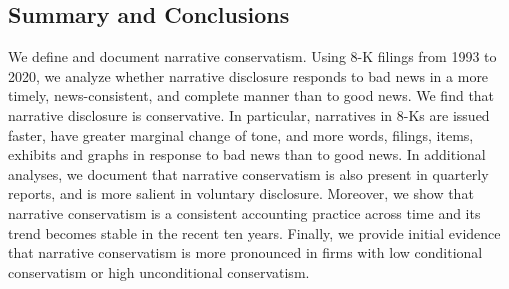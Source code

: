 \documentclass[letterpaper,12pt]{article}
\begin{document}
\begin{spacing}{1.5}
\section{Summary and Conclusions}

\noindent We define and document narrative conservatism. Using 8-K filings from 1993 to 2020, we analyze whether narrative disclosure responds to bad news in a more timely, news-consistent, and complete manner than to good news. We find that narrative disclosure is conservative. In particular, narratives in 8-Ks are issued faster, have greater marginal change of tone, and more words, filings, items, exhibits and graphs in response to bad news than to good news. In additional analyses, we document that narrative conservatism is also present in quarterly reports, and is more salient in voluntary disclosure. Moreover, we show that narrative conservatism is a consistent accounting practice across time and its trend becomes stable in the recent ten years. Finally, we provide initial evidence that narrative conservatism is more pronounced in firms with low conditional conservatism or high unconditional conservatism.


\end{spacing}
\end{document}
